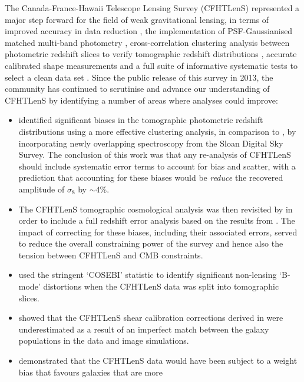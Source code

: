 The Canada-France-Hawaii Telescope Lensing Survey (CFHTLenS) represented a
major step forward for the field of weak gravitational lensing, in terms of
improved accuracy in data reduction \citep{CFHTLenS-data}, the implementation
of PSF-Gaussianised matched multi-band photometry
\citep{CFHTLenS-photoz}, cross-correlation clustering analysis between
photometric redshift slices to verify tomographic redshift distributions
\citep{CFHTLenS-2pt-tomo}, accurate calibrated shape measurements
\citep{CFHTLenS-shapes} and a full suite of informative systematic tests to
select a clean data set \citep{CFHTLenS-sys}. Since the public release
of this survey in 2013, the community has continued to scrutinise and advance
our understanding of CFHTLenS by identifying a number of areas where analyses
could improve:
%
\begin{itemize}
%
 \item{\citet{2016MNRAS.463.3737C} identified significant biases in the tomographic
photometric redshift distributions using a more effective clustering analysis,
in comparison to \citet{CFHTLenS-2pt-tomo}, by incorporating newly overlapping
spectroscopy from the Sloan Digital Sky Survey.  The conclusion of this work
was that any re-analysis of CFHTLenS should include systematic error terms to
account for bias and scatter, with a prediction that accounting for these
biases would be {\it reduce} the recovered amplitude of $\sigma_8$ by $\sim
4$\%. }
%
\item{ The CFHTLenS tomographic cosmological analysis was then revisited by
\citet{joudaki/etal:2016} in order to include a full redshift error analysis
based on the results from \citet{2016MNRAS.463.3737C}.  The impact of
correcting for these biases, including their associated errors, served to
reduce the overall constraining power of the survey and hence also the tension
between CFHTLenS and CMB constraints.}
%
 \item{\citet{2016arXiv160100115A} used the stringent `COSEBI' statistic to
identify significant non-lensing `B-mode' distortions when the CFHTLenS data
was split into tomographic slices.}
%
\item{\citet{2015MNRAS.454.3500K} showed that the CFHTLenS shear calibration
corrections derived in \citet{CFHTLenS-shapes} were underestimated as a result
of an imperfect match between the galaxy populations in the data and image
simulations.}
%
\item{\citet{2016arXiv160605337F} demonstrated that the CFHTLenS data would
have been subject to a weight bias that favours galaxies that are more
}
\end{itemize}
